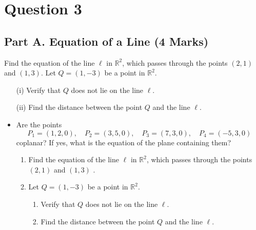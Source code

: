 \documentclass[12pt,a4paper]{article}
\begin{document}
\section*{Question 3}



\subsection*{Part A. Equation of a Line (4 Marks)}
Find the equation of the line $\ell$ in $\mathbb{R}^2$, which  passes through the points $(2,1)$ and $(1,3)$. Let $Q = (1, -3)$  be a point in $\mathbb{R}^2$.
	\begin{itemize}
		\item[(i)] Verify that $Q$ does not lie on the line $\ell$.
		
		\item[(ii)] Find the distance between the point $Q$ and the line $\ell$.
	\end{itemize}





\begin{itemize}
	\item Are the points 
	$$P_1=(1,2,0), \quad P_2=(3,5,0),\quad P_3=(7,3,0), \quad P_4=(-5,3,0)
	$$
	coplanar? If yes, what is the equation of the plane containing them?
	
	
	\begin{enumerate}
		\item Find the equation of the line $\ell$ in $\mathbb{R}^2$, which  passes through the 
		points $(2,1)$ and $(1,3)$ .
		
		\item  Let $Q = (1, -3)$  be a point in $\mathbb{R}^2$.
		\begin{enumerate}
			\item Verify that $Q$ does not lie on the line $\ell$.
			
			\item Find the distance between the point $Q$ and the line $\ell$.
		\end{enumerate}
	\end{enumerate}\newpage
	\vspace{0.25cm}
	
\end{itemize}
\end{document}
